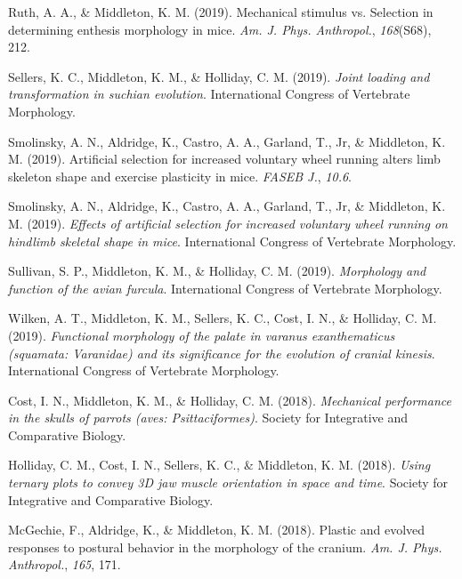 \documentclass[11pt, a4paper]{awesome-cv}
\begin{document}
\leavevmode\hypertarget{ref-Ruth2019-mq}{}%
Ruth, A. A., \& Middleton, K. M. (2019). Mechanical stimulus vs.
Selection in determining enthesis morphology in mice. \emph{Am. J. Phys.
Anthropol.}, \emph{168}(S68), 212.

\leavevmode\hypertarget{ref-Sellers2019-js}{}%
Sellers, K. C., Middleton, K. M., \& Holliday, C. M. (2019). \emph{Joint
loading and transformation in suchian evolution}. International Congress
of Vertebrate Morphology.

\leavevmode\hypertarget{ref-Smolinsky2019-lf}{}%
Smolinsky, A. N., Aldridge, K., Castro, A. A., Garland, T., Jr, \&
Middleton, K. M. (2019). Artificial selection for increased voluntary
wheel running alters limb skeleton shape and exercise plasticity in
mice. \emph{FASEB J.}, \emph{10.6}.

\leavevmode\hypertarget{ref-Smolinsky2019-in}{}%
Smolinsky, A. N., Aldridge, K., Castro, A. A., Garland, T., Jr, \&
Middleton, K. M. (2019). \emph{Effects of artificial selection for
increased voluntary wheel running on hindlimb skeletal shape in mice}.
International Congress of Vertebrate Morphology.

\leavevmode\hypertarget{ref-Sullivan2019-yv}{}%
Sullivan, S. P., Middleton, K. M., \& Holliday, C. M. (2019).
\emph{Morphology and function of the avian furcula}. International
Congress of Vertebrate Morphology.

\leavevmode\hypertarget{ref-Wilken2019-up}{}%
Wilken, A. T., Middleton, K. M., Sellers, K. C., Cost, I. N., \&
Holliday, C. M. (2019). \emph{Functional morphology of the palate in
\textup{varanus exanthematicus} (squamata: Varanidae) and its
significance for the evolution of cranial kinesis}. International
Congress of Vertebrate Morphology.

\leavevmode\hypertarget{ref-Cost2018-lx}{}%
Cost, I. N., Middleton, K. M., \& Holliday, C. M. (2018).
\emph{Mechanical performance in the skulls of parrots (aves:
Psittaciformes)}. Society for Integrative and Comparative Biology.

\leavevmode\hypertarget{ref-Holliday2018-nh}{}%
Holliday, C. M., Cost, I. N., Sellers, K. C., \& Middleton, K. M.
(2018). \emph{Using ternary plots to convey 3D jaw muscle orientation in
space and time}. Society for Integrative and Comparative Biology.

\leavevmode\hypertarget{ref-McGechie2018-sd}{}%
McGechie, F., Aldridge, K., \& Middleton, K. M. (2018). Plastic and
evolved responses to postural behavior in the morphology of the cranium.
\emph{Am. J. Phys. Anthropol.}, \emph{165}, 171.
\end{document}
